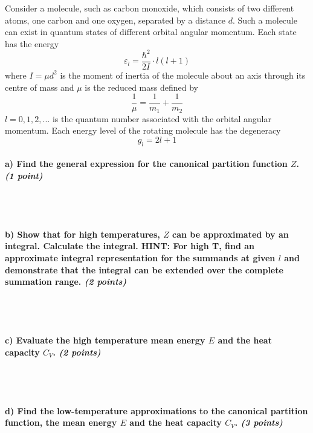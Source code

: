 Consider a molecule, such as carbon monoxide, which consists of two 
different atoms, one carbon and one oxygen, separated by a distance $d$. 
Such a molecule can exist in quantum states of different orbital angular 
momentum. Each state has the energy
\begin{equation}
    \varepsilon_l=\frac{\hbar^2}{2I}\cdot l(l+1)
\end{equation}
where $I=\mu d^2$ is the moment of inertia of the molecule about an axis 
through its centre of mass and $\mu$ is the reduced mass defined by 
$$\frac{1}{\mu}=\frac{1}{m_1}+\frac{1}{m_2}$$
$l=0,1,2,...$ is the quantum number associated with the orbital angular 
momentum. Each energy level of the rotating molecule has the degeneracy
$$g_l=2l+1$$

\paragraph{a) Find the general expression for the canonical partition 
    function $Z$. \textit{(1 point)}
} \ \\
\\

\paragraph{b) Show that for high temperatures, $Z$ can be approximated 
    by an integral. Calculate the integral. HINT: For high T, find an 
    approximate integral representation for the summands at given $l$ and
    demonstrate that the integral can be extended over the complete 
    summation range. \textit{(2 points)}
} \ \\
\\

\paragraph{c) Evaluate the high temperature mean energy $E$ and the heat 
    capacity $C_V$. \textit{(2 points)}
} \ \\
\\

\paragraph{d) Find the low-temperature approximations to the canonical 
    partition function, the mean energy $E$ and the heat capacity $C_V$.
    \textit{(3 points)}
} \ \\
\\
